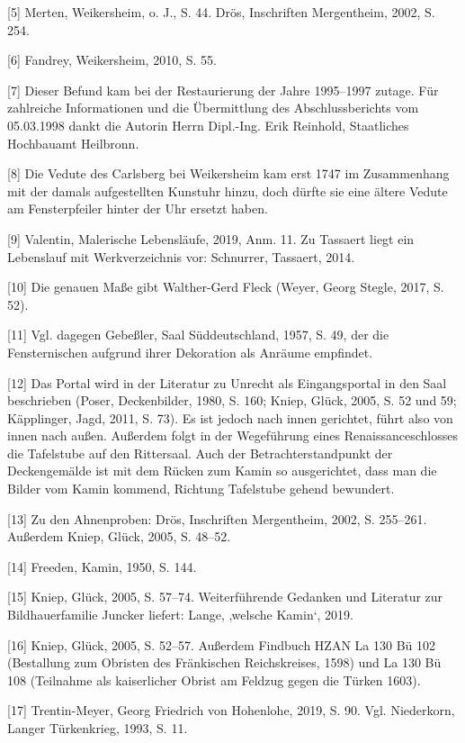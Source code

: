 \documentclass[
  a4paper,
  openany]{book}
\begin{document}
{[}5{]} Merten, Weikersheim, o. J., S. 44. Drös, Inschriften
Mergentheim, 2002, S. 254.

{[}6{]} Fandrey, Weikersheim, 2010, S. 55.

{[}7{]} Dieser Befund kam bei der Restaurierung der Jahre 1995--1997
zutage. Für zahlreiche Informationen und die Übermittlung des
Abschlussberichts vom 05.03.1998 dankt die Autorin Herrn Dipl.-Ing. Erik
Reinhold, Staatliches Hochbauamt Heilbronn.

{[}8{]} Die Vedute des Carlsberg bei Weikersheim kam erst 1747 im
Zusammenhang mit der damals aufgestellten Kunstuhr hinzu, doch dürfte
sie eine ältere Vedute am Fensterpfeiler hinter der Uhr ersetzt haben.

{[}9{]} Valentin, Malerische Lebensläufe, 2019, Anm. 11. Zu Tassaert
liegt ein Lebenslauf mit Werkverzeichnis vor: Schnurrer, Tassaert, 2014.

{[}10{]} Die genauen Maße gibt Walther-Gerd Fleck (Weyer, Georg Stegle,
2017, S. 52).

{[}11{]} Vgl. dagegen Gebeßler, Saal Süddeutschland, 1957, S. 49, der
die Fensternischen aufgrund ihrer Dekoration als Anräume empfindet.

{[}12{]} Das Portal wird in der Literatur zu Unrecht als Eingangsportal
in den Saal beschrieben (Poser, Deckenbilder, 1980, S. 160; Kniep,
Glück, 2005, S. 52 und 59; Käpplinger, Jagd, 2011, S. 73). Es ist jedoch
nach innen gerichtet, führt also von innen nach außen. Außerdem folgt in
der Wegeführung eines Renaissanceschlosses die Tafelstube auf den
Rittersaal. Auch der Betrachterstandpunkt der Deckengemälde ist mit dem
Rücken zum Kamin so ausgerichtet, dass man die Bilder vom Kamin kommend,
Richtung Tafelstube gehend bewundert.

{[}13{]} Zu den Ahnenproben: Drös, Inschriften Mergentheim, 2002, S.
255--261. Außerdem Kniep, Glück, 2005, S. 48--52.

{[}14{]} Freeden, Kamin, 1950, S. 144.

{[}15{]} Kniep, Glück, 2005, S. 57--74. Weiterführende Gedanken und
Literatur zur Bildhauerfamilie Juncker liefert: Lange, ‚welsche Kamin`,
2019.

{[}16{]} Kniep, Glück, 2005, S. 52--57. Außerdem Findbuch HZAN La 130 Bü
102 (Bestallung zum Obristen des Fränkischen Reichskreises, 1598) und La
130 Bü 108 (Teilnahme als kaiserlicher Obrist am Feldzug gegen die
Türken 1603).

{[}17{]} Trentin-Meyer, Georg Friedrich von Hohenlohe, 2019, S. 90. Vgl.
Niederkorn, Langer Türkenkrieg, 1993, S. 11.
\end{document}
